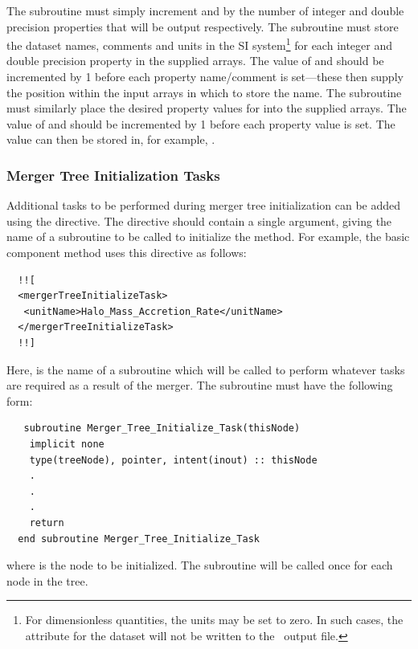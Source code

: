 The  subroutine must simply increment  and  by the number of integer and double precision properties that will be output respectively. The  subroutine must store the dataset names, comments and units in the SI system\footnote{For dimensionless quantities, the units may be set to zero. In such cases, the  attribute for the dataset will not be written to the \protect\glc\ output file.} for each integer and double precision property in the supplied arrays. The value of  and  should be incremented by 1 before each property name/comment is set---these then supply the position within the input arrays in which to store the name. The  subroutine must similarly place the desired property values for  into the supplied arrays. The value of  and  should be incremented by 1 
before each property value is set. The value can then be stored in, for example, .

\subsubsection{Merger Tree Initialization Tasks}

Additional tasks to be performed during merger tree initialization can be added using the  directive. The directive should contain a single argument, giving the name of a subroutine to be called to initialize the method. For example, the  basic component method uses this directive as follows:
\begin{verbatim}
  !![
  <mergerTreeInitializeTask>
   <unitName>Halo_Mass_Accretion_Rate</unitName>
  </mergerTreeInitializeTask>
  !!]
\end{verbatim}
Here,  is the name of a subroutine which will be called to perform whatever tasks are required as a result of the merger. The subroutine must have the following form:
\begin{verbatim}
   subroutine Merger_Tree_Initialize_Task(thisNode)
    implicit none
    type(treeNode), pointer, intent(inout) :: thisNode
    .
    .
    .
    return
  end subroutine Merger_Tree_Initialize_Task
\end{verbatim}
where  is the node to be initialized. The subroutine will be called once for each node in the tree.

